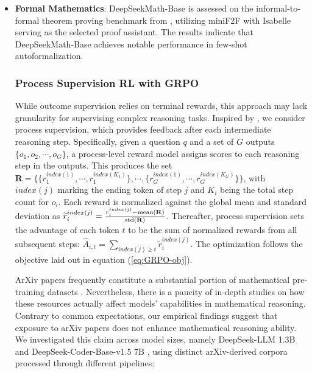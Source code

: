 \begin{itemize}[topsep=0pt]
\subsubsection{Code Training Benefits Mathematical Reasoning}

\item \textbf{Formal Mathematics}: DeepSeekMath-Base is assessed on the informal-to-formal theorem proving benchmark from \citep{dsp_proof}, utilizing miniF2F \citep{minif2f} with Isabelle \citep{isabelle} serving as the selected proof assistant. The results indicate that DeepSeekMath-Base achieves notable performance in few-shot autoformalization.

\subsubsection{Process Supervision RL with GRPO} While outcome supervision relies on terminal rewards, this approach may lack granularity for supervising complex reasoning tasks. Inspired by \cite{wang2023math}, we consider process supervision, which provides feedback after each intermediate reasoning step. Specifically, given a question $q$ and a set of $G$ outputs $\{o_1, o_2, \cdots, o_G\}$, a process-level reward model assigns scores to each reasoning step in the outputs. This produces the set $\mathbf{R} = \{ \{r_1^{index(1)},\cdots,r_1^{index(K_1)}\}, \cdots,  \{r_G^{index(1)},\cdots,r_G^{index(K_G)}\} \}$, with $index(j)$ marking the ending token of step $j$ and $K_i$ being the total step count for $o_i$. Each reward is normalized against the global mean and standard deviation as $\widetilde{r}_i^{index(j)} = \frac{r_i^{index(j)} - {\rm mean(\mathbf{R})}}{{\rm std(\mathbf{R})}}$.
Thereafter, process supervision sets the advantage of each token $t$ to be the sum of normalized rewards from all subsequent steps: $\hat{A}_{i, t} = \sum_{index(j) \ge t} \widetilde{r}_i^{index(j)}$. The optimization follows the objective laid out in equation (\ref{eq:GRPO-obj}).

ArXiv papers frequently constitute a substantial portion of mathematical pre-training datasets \citep{minerva,gpt-f,llemma,mathpile}. Nevertheless, there is a paucity of in-depth studies on how these resources actually affect models’ capabilities in mathematical reasoning. Contrary to common expectations, our empirical findings suggest that exposure to arXiv papers does not enhance mathematical reasoning ability. We investigated this claim across model sizes, namely DeepSeek-LLM 1.3B and DeepSeek-Coder-Base-v1.5 7B \citep{deepseek-coder}, using distinct arXiv-derived corpora processed through different pipelines:


\end{itemize}
